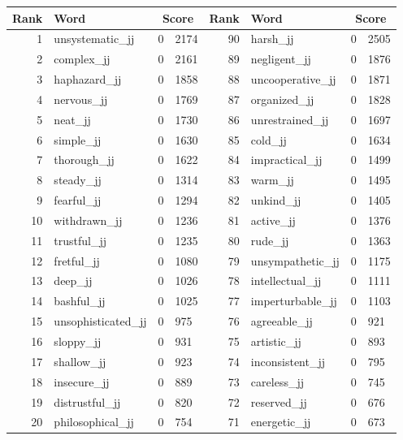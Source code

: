 \begin{table}[tbp]
    \begin{tabular}{| rlr@{.}l | rlr@{.}l |}
    \hline
    \textbf{Rank} & \textbf{Word} & \multicolumn{2}{c|}{\textbf{Score}} & \textbf{Rank} & \textbf{Word} & \multicolumn{2}{c|}{\textbf{Score}} \\
    \hline
    1 & unsystematic\_jj & 0 & 2174    &    90 & harsh\_jj & 0 & 2505 \\
    2 & complex\_jj & 0 & 2161    &    89 & negligent\_jj & 0 & 1876 \\
    3 & haphazard\_jj & 0 & 1858    &    88 & uncooperative\_jj & 0 & 1871 \\
    4 & nervous\_jj & 0 & 1769    &    87 & organized\_jj & 0 & 1828 \\
    5 & neat\_jj & 0 & 1730    &    86 & unrestrained\_jj & 0 & 1697 \\
    6 & simple\_jj & 0 & 1630    &    85 & cold\_jj & 0 & 1634 \\
    7 & thorough\_jj & 0 & 1622    &    84 & impractical\_jj & 0 & 1499 \\
    8 & steady\_jj & 0 & 1314    &    83 & warm\_jj & 0 & 1495 \\
    9 & fearful\_jj & 0 & 1294    &    82 & unkind\_jj & 0 & 1405 \\
    10 & withdrawn\_jj & 0 & 1236    &    81 & active\_jj & 0 & 1376 \\
    11 & trustful\_jj & 0 & 1235    &    80 & rude\_jj & 0 & 1363 \\
    12 & fretful\_jj & 0 & 1080    &    79 & unsympathetic\_jj & 0 & 1175 \\
    13 & deep\_jj & 0 & 1026    &    78 & intellectual\_jj & 0 & 1111 \\
    14 & bashful\_jj & 0 & 1025    &    77 & imperturbable\_jj & 0 & 1103 \\
    15 & unsophisticated\_jj & 0 & 975    &    76 & agreeable\_jj & 0 & 921 \\
    16 & sloppy\_jj & 0 & 931    &    75 & artistic\_jj & 0 & 893 \\
    17 & shallow\_jj & 0 & 923    &    74 & inconsistent\_jj & 0 & 795 \\
    18 & insecure\_jj & 0 & 889    &    73 & careless\_jj & 0 & 745 \\
    19 & distrustful\_jj & 0 & 820    &    72 & reserved\_jj & 0 & 676 \\
    20 & philosophical\_jj & 0 & 754    &    71 & energetic\_jj & 0 & 673 \\

\end{tabular}
\end{table}
